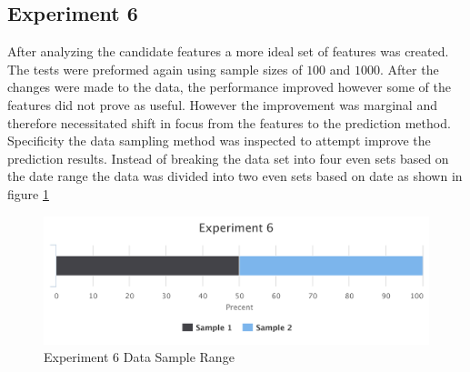 \subsection{Experiment 6}

After analyzing the candidate features a more ideal set of features was created. The tests were preformed again using sample sizes of $100$ and $1000$. After the changes were made to the data, the performance improved however some of the features did not prove as useful. However the improvement was marginal and therefore necessitated shift in focus from the features to the prediction method. Specificity the data sampling method was inspected to attempt improve the prediction results. Instead of breaking the data set into four even sets based on the date range the data was divided into two even sets based on date as shown in figure \ref{fig:exp_6_data_range}

\begin{figure}[!ht]
    \centering
        \includegraphics[width=1.0\textwidth]{images/exp_6_data_range}
    \caption{Experiment 6 Data Sample Range}
    \label{fig:exp_6_data_range}
\end{figure}







